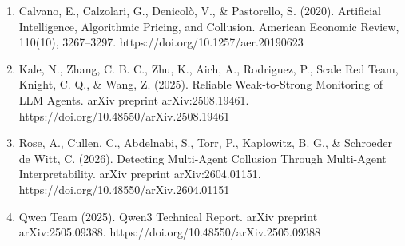 \documentclass[11pt,letterpaper]{article}
\newenvironment{instr}{\par\itshape\setlength{\parindent}{0pt}\raggedright}{\par}
\begin{document}
\begin{instr}
\begin{enumerate}[leftmargin=0.5in, labelwidth=0.25in, labelsep=0pt, align=left, label=\arabic*., ref=\arabic*, font=\upshape, itemsep=0pt, parsep=0pt, topsep=0pt]
\item \upshape Calvano, E., Calzolari, G., Denicol\`o, V., \& Pastorello, S. (2020). Artificial Intelligence, Algorithmic Pricing, and Collusion. American Economic Review, 110(10), 3267--3297. https://doi.org/10.1257/aer.20190623\label{ref:calvano}
\item \upshape Kale, N., Zhang, C. B. C., Zhu, K., Aich, A., Rodriguez, P., Scale Red Team, Knight, C. Q., \& Wang, Z. (2025). Reliable Weak-to-Strong Monitoring of LLM Agents. arXiv preprint arXiv:2508.19461. https://doi.org/10.48550/arXiv.2508.19461\label{ref:kale}
\item \upshape Rose, A., Cullen, C., Abdelnabi, S., Torr, P., Kaplowitz, B. G., \& Schroeder de Witt, C. (2026). Detecting Multi-Agent Collusion Through Multi-Agent Interpretability. arXiv preprint arXiv:2604.01151. https://doi.org/10.48550/arXiv.2604.01151\label{ref:rose}
\item \upshape Qwen Team (2025). Qwen3 Technical Report. arXiv preprint arXiv:2505.09388. https://doi.org/10.48550/arXiv.2505.09388\label{ref:qwen3}
\end{enumerate}
\end{instr}
\end{document}
